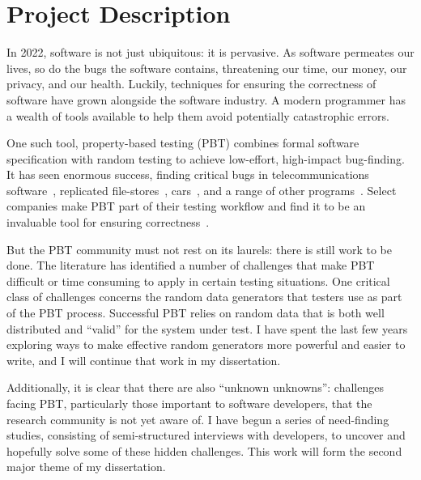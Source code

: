 \section{Project Description }


In 2022, software is not just ubiquitous: it is pervasive.  As software
permeates our lives, so do the bugs the software contains, threatening our
time, our money, our privacy, and our health.
Luckily, techniques for ensuring the correctness of software have grown
alongside the software industry. A modern programmer has a wealth of tools
available to help them avoid potentially catastrophic errors.

One such tool,
property-based testing (PBT) combines formal software specification with random
testing to achieve low-effort, high-impact bug-finding. It has
seen enormous success, finding critical bugs in telecommunications
software~\cite{arts2006testing}, replicated
file-stores~\cite{hughes2014mysteries}, cars~\cite{arts2015testing}, and a range
of other programs~\cite{hughes2016experiences}. Select companies make PBT part of
their testing workflow and find it to be an invaluable tool for ensuring
correctness~\cite{Bornholt2021}.

But the PBT community must not rest on its laurels: there is still work to be
done. The literature has identified a number of challenges that make PBT
difficult or time consuming to apply in certain testing situations. One critical
class of challenges concerns the random data generators that testers use as part
of the PBT process.
Successful PBT relies on random data that is both well distributed and ``valid''
for the system under test. I have spent the last few years exploring ways to
make effective random generators more powerful and easier to write, and I will
continue that work in my dissertation.

Additionally, it is clear that there are also ``unknown unknowns'': challenges
facing PBT, particularly those important to software developers, that the
research community is not yet aware of. I have begun a series of need-finding
studies, consisting of semi-structured interviews with developers, to uncover
and hopefully solve some of these hidden challenges. This work will form the
second major theme of my dissertation.

